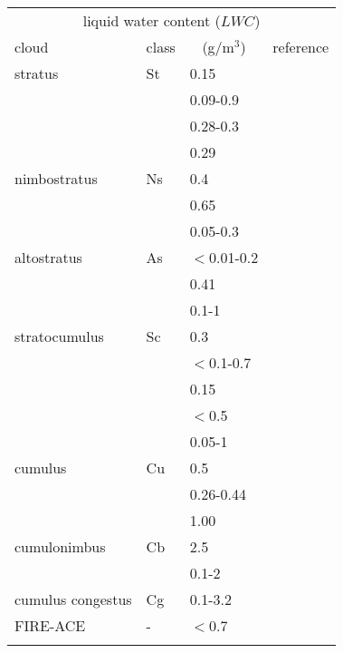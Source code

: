 \begin{table}[!htb]
\begin{center}
\begin{tabular}{llll}
\hline
\multicolumn{4}{c}{liquid water content ($LWC$)} \\
 cloud        & class & \multicolumn{1}{c}{(g/m$^3$)} & reference\\
\hline
 stratus      & St    & 0.15        & \cite{salby:96}\\
              &       & 0.09-0.9    & \cite{seinfeld:98}\\
              &       & 0.28-0.3    & \cite{hess:98}\\
              &       & 0.29        & \cite{abreu:96}\\
 nimbostratus & Ns    & 0.4         & \cite{salby:96}\\
              &       & 0.65        & \cite{abreu:96}\\
              &       & 0.05-0.3    & \cite{berton:00}\\
 altostratus  & As    & $<$0.01-0.2 & \cite{seinfeld:98}\\
              &       & 0.41        & \cite{abreu:96}\\
              &       & 0.1-1       & \cite{berton:00}\\
 stratocumulus& Sc    & 0.3         & \cite{salby:96}\\
              &       & $<$0.1-0.7  & \cite{seinfeld:98}\\
              &       & 0.15        & \cite{abreu:96}\\
              &       & $<$0.5      & \cite{pawlowskaetal:00}\\
              &       & 0.05-1      & \cite{berton:00}\\
 cumulus      & Cu    & 0.5         & \cite{salby:96}\\
              &       & 0.26-0.44   & \cite{hess:98}\\
              &       & 1.00        & \cite{abreu:96}\\
 cumulonimbus & Cb    & 2.5         & \cite{salby:96}\\
              &       & 0.1-2       & \cite{berton:00}\\
 cumulus 
    congestus & Cg    & 0.1-3.2     & \cite{berton:00}\\
FIRE-ACE      & -     & $<$0.7      & \cite{shupeetal:00}\\
\hline
\multicolumn{4}{c}{}  \\

\end{tabular}
\end{center}
\end{table}
